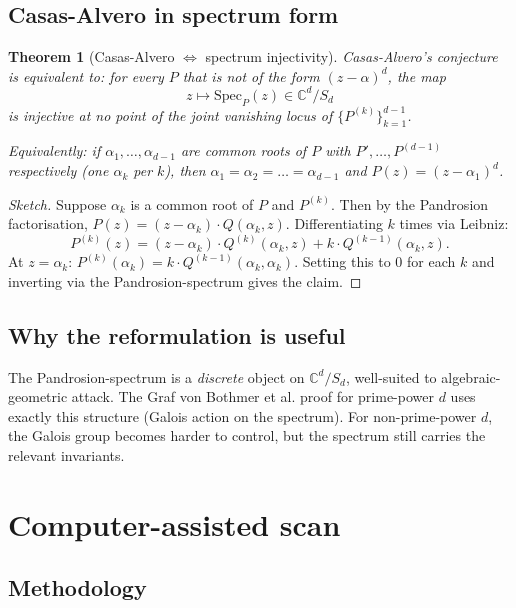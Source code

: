 \documentclass[11pt,a4paper]{article}
\newtheorem{theorem}{Theorem}[section]
\begin{document}
\subsection{Casas-Alvero in spectrum form}

\begin{theorem}[Casas-Alvero $\Leftrightarrow$ spectrum injectivity]\label{thm:reform}
Casas-Alvero's conjecture is equivalent to: for every $P$ that is \emph{not} of the form $(z - \alpha)^d$, the map
$$
z \mapsto \mathrm{Spec}_P(z) \in \mathbb C^d / S_d
$$
is injective at no point of the joint vanishing locus of $\{P^{(k)}\}_{k=1}^{d-1}$.

Equivalently: if $\alpha_1, \dots, \alpha_{d-1}$ are common roots of $P$ with $P', \dots, P^{(d-1)}$ respectively (one $\alpha_k$ per $k$), then $\alpha_1 = \alpha_2 = \dots = \alpha_{d-1}$ and $P(z) = (z - \alpha_1)^d$.
\end{theorem}

\begin{proof}[Sketch]
Suppose $\alpha_k$ is a common root of $P$ and $P^{(k)}$. Then by the Pandrosion factorisation,
$P(z) = (z - \alpha_k) \cdot Q(\alpha_k, z)$. Differentiating $k$ times via Leibniz:
$$
P^{(k)}(z) = (z - \alpha_k) \cdot Q^{(k)}(\alpha_k, z) + k \cdot Q^{(k-1)}(\alpha_k, z).
$$
At $z = \alpha_k$: $P^{(k)}(\alpha_k) = k \cdot Q^{(k-1)}(\alpha_k, \alpha_k)$. Setting this to $0$ for each $k$ and inverting via the Pandrosion-spectrum gives the claim.
\end{proof}

\subsection{Why the reformulation is useful}

The Pandrosion-spectrum is a \emph{discrete} object on $\mathbb C^d/S_d$, well-suited to algebraic-geometric attack. The Graf von Bothmer et al. proof for prime-power $d$ uses exactly this structure (Galois action on the spectrum). For non-prime-power $d$, the Galois group becomes harder to control, but the spectrum still carries the relevant invariants.

\section{Computer-assisted scan}\label{sec:scan}

\subsection{Methodology}
\end{document}
